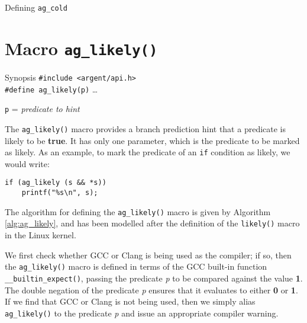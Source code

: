   \begin{algorithm}
    \scriptsize
    \caption{Defining \texttt{ag\_cold}}
    \label{alg:ag_cold}
  \begin{algorithmic}
    \Else
    \EndIf
  \end{algorithmic}
  \end{algorithm}


%


\section{Macro \texttt{ag\_likely()}}

\begin{bclogo}[logo=\bccrayon, noborder=true, barre=snake, couleurBarre=gray]
  {Synopsis}
  \small
  \verb|#include <argent/api.h>| \\
  \verb|#define ag_likely(p)| \ldots \par
  \texttt{p} = \emph{predicate to hint}
\end{bclogo}

The \verb|ag_likely()| macro provides a branch prediction hint that a predicate
is likely to be \textbf{true}. It has only one parameter, which is the predicate 
to be marked as likely. As an example, to mark the predicate of an \verb|if| 
condition as likely, we would write:

\begin{lstlisting}[linewidth=1.0\linewidth,
    caption=Example use of ag\_likely()]
if (ag_likely (s && *s)) 
    printf("%s\n", s);
\end{lstlisting}

The algorithm for defining the \verb|ag_likely()| macro is given by Algorithm
\ref{alg:ag_likely}, and has been modelled after the definition of the
\verb|likely()| macro in the Linux kernel. 

We first check whether GCC or Clang is being used as the compiler; if so, then 
the \verb|ag_likely()| macro is defined in terms of the GCC built-in function 
\verb|__builtin_expect()|, passing the predicate \emph{p} to be compared against 
the value \textbf{1}. The double negation of the predicate \emph{p} ensures that 
it evaluates to either \textbf{0} or \textbf{1}. If we find that GCC or Clang is
not being used, then we simply alias \verb|ag_likely()| to the predicate
\emph{p} and issue an appropriate compiler warning.

